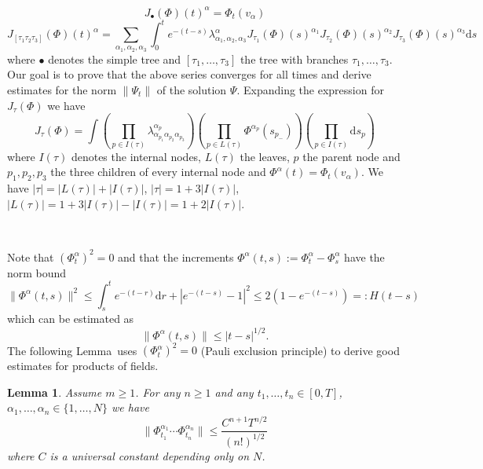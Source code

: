 \documentclass{article}
\newcommand{\assign}{:=}
\newcommand{\backassign}{=:}
\newcommand{\mathd}{\mathrm{d}}
\newtheorem{lemma}[theorem]{Lemma}
\begin{document}
\[ J_{\bullet} (\Phi) (t)^{\alpha} = \Phi_t (v_{\alpha}) \]
\[ J_{[\tau_1 \tau_2 \tau_3]} (\Phi) (t)^{\alpha} = \sum_{\alpha_1, \alpha_2,
   \alpha_3} \int_0^t e^{- (t - s)} \lambda^{\alpha}_{\alpha_1, \alpha_2,
   \alpha_3} J_{\tau_1} (\Phi) (s)^{\alpha_1} J_{\tau_2} (\Phi) (s)^{\alpha_2}
   J_{\tau_3} (\Phi) (s)^{\alpha_3} \mathd s \]
where $\bullet$ denotes the simple tree and $[\tau_1, \ldots, \tau_3]$ the
tree with branches $\tau_1, \ldots, \tau_3$. Our goal is to prove that the
above series converges for all times and derive estimates for the norm $\|
\Psi_t \|$ of the solution $\Psi$. Expanding the expression for $J_{\tau}
(\Phi)$ we have
\[ J_{\tau} (\Phi) = \int \left( \prod_{p \in I (\tau)}
   \lambda^{\alpha_p}_{\alpha_{p_1} \alpha_{p_2} \alpha_{p_3}} \right) \left(
   \prod_{p \in L (\tau)} \Phi^{\alpha_p} (s_{p_-}) \right) \left( \prod_{p
   \in I (\tau)} \mathd s_p \right) \]
where $I (\tau)$ denotes the internal nodes, $L (\tau)$ the leaves, $p$ the
parent node and $p_1, p_2, p_3$ the three children of every internal node and
$\Phi^{\alpha} (t) = \Phi_t (v_{\alpha})$. We have $| \tau | = | L (\tau) | +
| I (\tau) |$, $| \tau | = 1 + 3 | I (\tau) |$, $| L (\tau) | = 1 + 3 | I
(\tau) | - | I (\tau) | = 1 + 2 | I (\tau) |$.

\

Note that $(\Phi^{\alpha}_t)^2 = 0$ and that the increments $\Phi^{\alpha}
(t, s) \assign \Phi^{\alpha}_t - \Phi^{\alpha}_s$ have the norm bound
\[ \| \Phi^{\alpha} (t, s) \|^2 \leqslant \int_s^t e^{- (t - r)} \mathd r + |
   e^{- (t - s)} - 1 |^2 \leqslant 2 (1 - e^{- (t - s)}) \backassign H (t - s)
\]
which can be estimated as
\[ \| \Phi^{\alpha} (t, s) \| \leqslant | t - s |^{1 / 2} . \]
The following Lemma~uses $(\Phi^{\alpha}_t)^2 = 0$ (Pauli exclusion principle)
to derive good estimates for products of fields.

\begin{lemma}
  Assume $m \geqslant 1$. For any $n \geqslant 1$ and any $t_1, \ldots, t_n
  \in [0, T]$, $\alpha_1, \ldots, \alpha_n \in \{ 1, \ldots, N \}$ we have
  \[ \| \Phi^{\alpha_1}_{t_1} \cdots \Phi^{\alpha_n}_{t_n} \| \leqslant
     \frac{C^{n + 1} T^{n / 2}}{(n!)^{1 / 2}} \]
  where $C$ is a universal constant depending only on $N$.
\end{lemma}
\end{document}
